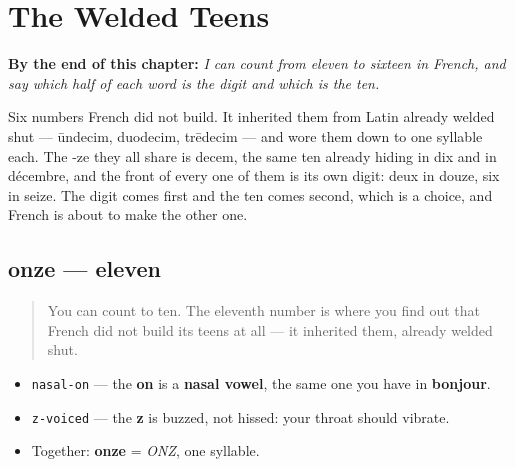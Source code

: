 
\chapter{The Welded Teens}
\label{ch:numbers-11-16}

\begin{chapteropening}
\textbf{By the end of this chapter:} \emph{I can count from eleven to sixteen in French, and say which half of each word is the digit and which is the ten.}

Six numbers French did not build. It inherited them from Latin already welded shut — ūndecim, duodecim, trēdecim — and wore them down to one syllable each. The -ze they all share is decem, the same ten already hiding in dix and in décembre, and the front of every one of them is its own digit: deux in douze, six in seize. The digit comes first and the ten comes second, which is a choice, and French is about to make the other one.
\end{chapteropening}

\section[onze]{onze — eleven}

\label{lesson:FR-C12-onze}



\begin{quote}
You can count to ten. The eleventh number is where you find out that French did not build its teens at all — it inherited them, already welded shut.
\end{quote}

\begin{sounds}
\begin{itemize}
\raggedright
  \item \texttt{nasal-on} — the \textbf{on} is a \textbf{nasal vowel}, the same one you have in \textbf{bonjour}.
  \item \texttt{z-voiced} — the \textbf{z} is buzzed, not hissed: your throat should vibrate.
  \item Together: \textbf{onze} = \emph{ONZ}, one syllable.
\end{itemize}
\end{sounds}

